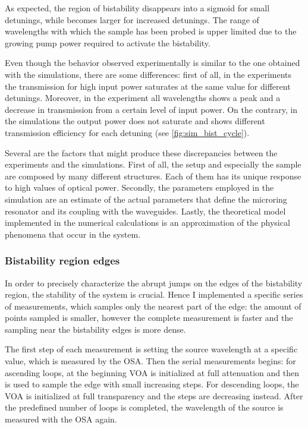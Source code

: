 As expected, the region of bistability disappears into a sigmoid for small detunings, while becomes larger for increased detunings.
The range of wavelengths with which the sample has been probed is upper limited due to the growing pump power required to activate the bistability.

Even though the behavior observed experimentally is similar to the one obtained with the simulations, there are some differences:
first of all, in the experiments the transmission for high input power saturates at the same value for different detunings.
Moreover, in the experiment all wavelengths shows a peak and a decrease in transmission from a certain level of input power.
On the contrary, in the simulations the output power does not saturate and shows different transmission efficiency for each detuning (see \autoref{fig:sim_bist_cycle}).

Several are the factors that might produce these discrepancies between the experiments and the simulations.
First of all, the setup and especially the sample are composed by many different structures.
Each of them has its unique response to high values of optical power.
Secondly, the parameters employed in the simulation are an estimate of the actual parameters that define the microring resonator and its coupling with the waveguides.
Lastly, the theoretical model implemented in the numerical calculations is an approximation of the physical phenomena that occur in the system.

\subsubsection{Bistability region edges}
\label{sssec:bistability_region_edges}
In order to precisely characterize the abrupt jumps on the edges of the bistability region, the stability of the system is crucial.
Hence I implemented a specific series of measurements, which samples only the nearest part of the edge: the amount of points sampled is smaller, however the complete measurement is faster and the sampling near the bistability edges is more dense.

The first step of each measurement is setting the source wavelength at a specific value, which is measured by the \ac{OSA}.
Then the serial measurements begins: for ascending loops, at the beginning \ac{VOA} is initialized at full attenuation and then is used to sample the edge with small increasing steps.
For descending loops, the \ac{VOA} is initialized at full transparency and the steps are decreasing instead.
After the predefined number of loops is completed, the wavelength of the source is measured with the \ac{OSA} again.

